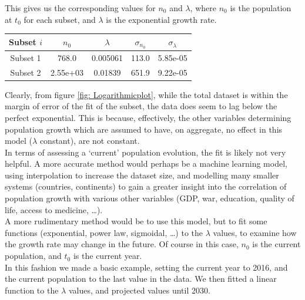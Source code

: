 \documentclass{article}
\theoremstyle{definition}
\theoremstyle{remark}
\begin{document}
This gives us the corresponding values for $n_0$ and $\lambda$, where $n_0$ is the population at $t_0$ for each subset, and $\lambda$ is the exponential growth rate.\\
\begin{center}
\begin{tabular}{c|c|c|c|c}
    \hline
    \hline
    Subset $i$ & $n_0$ & $\lambda$ & $\sigma_{n_0}$ & $\sigma_{\lambda}$ \\ 
    \hline
    Subset 1 & 768.0 & 0.005061 & 113.0 & 5.85e-05 \\ 
    Subset 2 & 2.55e+03 & 0.01839 & 651.9 & 9.22e-05 \\
    \hline
    \hline
\end{tabular}
\end{center}
Clearly, from figure \ref{fig: Logarithmicplot}, while the total dataset is within the margin of error of the fit of the subset, the data does seem to lag below the perfect exponential. This is because, effectively, the other variables determining population growth which are assumed to have, on aggregate, no effect in this model ($\lambda$ constant), are not constant.\\
\indent In terms of assessing a `current' population evolution, the fit is likely not very helpful. A more accurate method would perhaps be a machine learning model, using interpolation to increase the dataset size, and modelling many smaller systems (countries, continents) to gain a greater insight into the correlation of population growth with various other variables (GDP, war, education, quality of life, access to medicine, \dots).\\
\indent A more rudimentary method would be to use this model, but to fit some functions (exponential, power law, sigmoidal,  \dots) to the $\lambda$ values, to examine how the growth rate may change in the future. Of course in this case, $n_0$ is the current population, and $t_0$ is the current year.\\
\indent In this fashion we made a basic example, setting the current year to 2016, and the current population to the last value in the data. We then fitted a linear function to the $\lambda$ values, and projected values until 2030.\\
\end{document}
